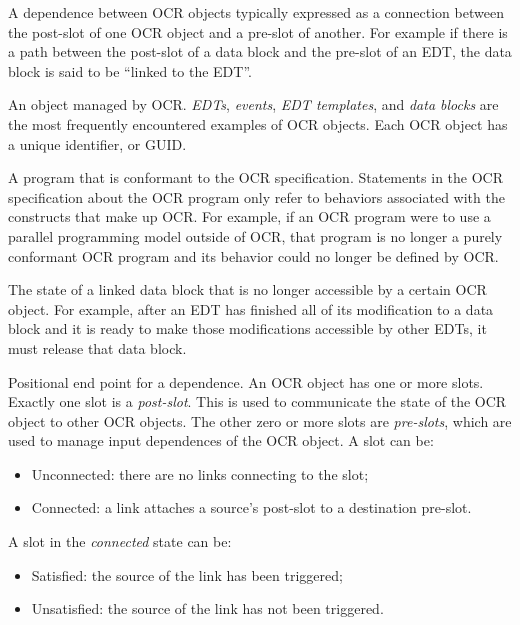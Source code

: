 
\glossarydefstart
A dependence between OCR objects typically expressed as a connection
between the post-slot of one OCR object and a pre-slot of
another. For example if there is a path between the post-slot of a data block and
the pre-slot of an EDT, the data block is said to be ``linked to the EDT''.
\glossarydefend

\glossarydefstart
An object managed by OCR. \emph{EDTs}, \emph{events},
\emph{EDT templates}, and \emph{data blocks} are the most frequently
encountered examples of OCR objects. Each OCR object has a unique
identifier, or GUID.
\glossarydefend

\glossarydefstart
A program that is conformant to the OCR specification. Statements in
the OCR specification about the OCR program only refer to behaviors
associated with the constructs that make up OCR. For example, if an
OCR program were to use a parallel programming model outside of OCR,
that program is no longer a purely conformant OCR program and its
behavior could no longer be defined by OCR.
\glossarydefend

\glossarydefstart
The state of a linked data block that is no longer accessible by a certain OCR
object. For example, after an EDT has finished all of its
modification to a data block and it is ready to make those
modifications accessible by other EDTs, it must release that data
block.
\glossarydefend

\glossarydefstart
Positional end point for a dependence. An OCR object has one or more
slots. Exactly one slot is a \emph{post-slot}. This is used to
communicate the state of the OCR object to other OCR objects. The
other zero or more slots are \emph{pre-slots}, which are used to manage
input dependences of the OCR object. A slot can be:
\begin{itemize}
\item Unconnected: there are no links connecting to the slot;
\item Connected: a link attaches a source's post-slot to a destination pre-slot.
\end{itemize}
A slot in the \emph{connected} state can be:
\begin{itemize}
\item Satisfied: the source of the link has been triggered;
\item Unsatisfied: the source of the link has not been triggered.
\end{itemize}
\glossarydefend

